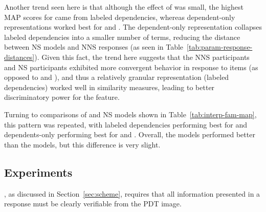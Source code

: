 Another trend seen here is that although the effect of  was small, the highest MAP scores for  came from labeled dependencies, whereas dependent-only representations worked best for  and . The dependent-only representation collapses labeled dependencies into a smaller number of terms, reducing the distance between NS models and NNS responses (as seen in Table~\ref{tab:param-response-distances}). Given this fact, the trend here suggests that the NNS participants and  NS participants exhibited more convergent behavior in response to  items (as opposed to  and ), and thus a relatively granular representation (labeled dependencies) worked well in similarity measures, leading to better discriminatory power for the  feature.

Turning to comparisons of  and  NS models shown in Table~\ref{tab:interp-fam-map}, this pattern was repeated, with labeled dependencies performing best for  and dependents-only performing best for  and . Overall, the  models performed better than the  models, but this difference is very slight.



\subsection{ Experiments}
\label{sec:map-verif}

, as discussed in Section~\ref{sec:scheme}, requires that all information presented in a response must be clearly verifiable from the PDT image.


